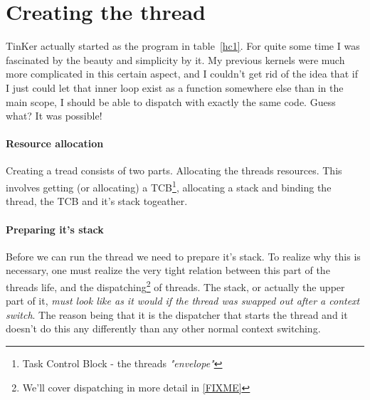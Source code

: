 {\section{Creating the thread}
\label{MakeOfThread}
	TinKer actually started as the program in table~\ref{hc1}. For quite some time I was fascinated by the beauty and simplicity by it. My previous kernels were much more complicated in this certain aspect, and I couldn't get rid of the idea that if I just could let that inner loop exist as a function somewhere else than in the main scope, I should be able to dispatch with exactly the same code. Guess what? It was possible!

	\paragraph{Resource allocation} 
		Creating a tread consists of two parts. Allocating the threads resources. This involves getting (or allocating) a TCB\footnote{Task Control Block - the threads \textit{"envelope"}}, allocating a stack and binding the thread, the TCB and it's stack togeather.

	\paragraph{Preparing it's stack} 
		Before we can run the thread we need to prepare it's stack. To realize why this is necessary, one must realize the very tight relation between this part of the threads life, and the dispatching\footnote{We'll cover dispatching in more detail in \ref{FIXME}} of threads. The stack, or actually the upper part of it, \textit{must look like as it would if the thread was swapped out after a context switch}. The reason being that it is the dispatcher that starts the thread and it doesn't do this any differently than any other normal context switching.

}
